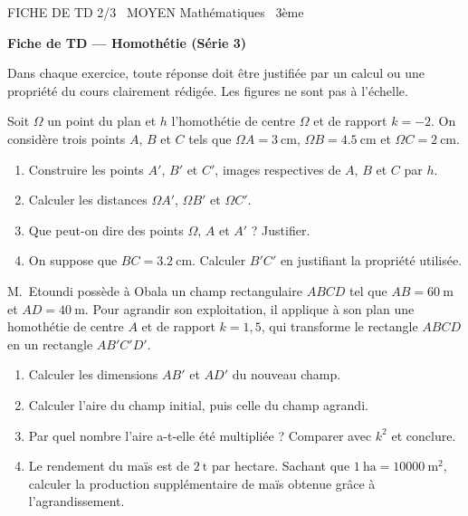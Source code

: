 \documentclass[11pt]{article}
\begin{document}
\begin{tcolorbox}[enhanced,colback=popink,colframe=popink,arc=10pt,boxrule=0pt,left=12pt,right=12pt,top=9pt,bottom=9pt]
{\color{white}\popxbold\small FICHE DE TD 2/3 \textbullet\ MOYEN \hfill Mathématiques \textbullet\ 3ème\par}
\end{tcolorbox}
\vspace{4pt}
\textbf{Fiche de TD — Homothétie (Série 3)}

\medskip
Dans chaque exercice, toute réponse doit être justifiée par un calcul ou une propriété du cours clairement rédigée. Les figures ne sont pas à l'échelle.

\begin{exercice}
Soit $\Omega$ un point du plan et $h$ l'homothétie de centre $\Omega$ et de rapport $k = -2$. On considère trois points $A$, $B$ et $C$ tels que $\Omega A = \SI{3}{\centi\metre}$, $\Omega B = \SI{4,5}{\centi\metre}$ et $\Omega C = \SI{2}{\centi\metre}$.
\begin{enumerate}
\item Construire les points $A'$, $B'$ et $C'$, images respectives de $A$, $B$ et $C$ par $h$.
\item Calculer les distances $\Omega A'$, $\Omega B'$ et $\Omega C'$.
\item Que peut-on dire des points $\Omega$, $A$ et $A'$ ? Justifier.
\item On suppose que $BC = \SI{3,2}{\centi\metre}$. Calculer $B'C'$ en justifiant la propriété utilisée.
\end{enumerate}
\end{exercice}

\begin{exercice}
M.~Etoundi possède à Obala un champ rectangulaire $ABCD$ tel que $AB = \SI{60}{\metre}$ et $AD = \SI{40}{\metre}$. Pour agrandir son exploitation, il applique à son plan une homothétie de centre $A$ et de rapport $k = 1{,}5$, qui transforme le rectangle $ABCD$ en un rectangle $AB'C'D'$.
\begin{enumerate}
\item Calculer les dimensions $AB'$ et $AD'$ du nouveau champ.
\item Calculer l'aire du champ initial, puis celle du champ agrandi.
\item Par quel nombre l'aire a-t-elle été multipliée ? Comparer avec $k^2$ et conclure.
\item Le rendement du maïs est de $\SI{2}{\tonne}$ par hectare. Sachant que $\SI{1}{\hectare} = \SI{10000}{\metre\squared}$, calculer la production supplémentaire de maïs obtenue grâce à l'agrandissement.
\end{enumerate}
\end{exercice}
\end{document}

